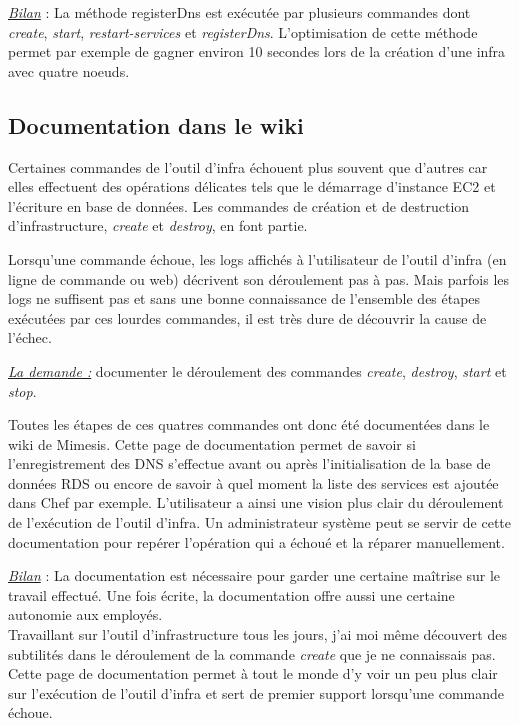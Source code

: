 \underline{\textit{Bilan}} : La méthode registerDns est exécutée par plusieurs commandes
dont \textit{create}, \textit{start}, \textit{restart-services} et
\textit{registerDns}. L'optimisation de cette méthode permet par exemple de
gagner environ 10 secondes lors de la création d'une infra avec quatre noeuds.

\subsection{Documentation dans le wiki}

Certaines commandes de l'outil d'infra échouent plus souvent que
d'autres car elles effectuent des opérations délicates tels que le démarrage
d'instance EC2 et l'écriture en base de données. Les commandes de création et de
destruction d'infrastructure, \textit{create} et \textit{destroy}, en font
partie.

Lorsqu'une commande échoue, les logs affichés à l'utilisateur de l'outil d'infra
(en ligne de commande ou web) décrivent son déroulement pas à pas. Mais parfois
les logs ne suffisent pas et sans une bonne connaissance de l'ensemble des
étapes exécutées par ces lourdes commandes, il est très dure de découvrir la
cause de l'échec.

\underline{\textit{La demande :}} documenter le déroulement des commandes \textit{create},
\textit{destroy}, \textit{start} et \textit{stop}.

Toutes les étapes de ces quatres commandes ont donc été documentées dans le wiki
de Mimesis. Cette page de documentation permet de savoir si l'enregistrement des
DNS s'effectue avant ou après l'initialisation de la base de données RDS ou
encore de savoir à quel moment la liste des services est ajoutée dans Chef par
exemple.
L'utilisateur a ainsi une vision plus clair du déroulement de l'exécution de
l'outil d'infra.
Un administrateur système peut se servir de cette documentation pour repérer
l'opération qui a échoué et la réparer manuellement.

\underline{\textit{Bilan}} : La documentation est nécessaire pour garder une certaine
maîtrise sur le travail effectué. Une fois écrite, la documentation offre aussi
une certaine autonomie aux employés. \\
Travaillant sur l'outil d'infrastructure tous les jours, j'ai moi même découvert
des subtilités dans le déroulement de la commande \textit{create} que je ne
connaissais pas. Cette page de documentation permet à tout le monde d'y voir
un peu plus clair sur l'exécution de l'outil d'infra et sert de premier support
lorsqu'une commande échoue.


